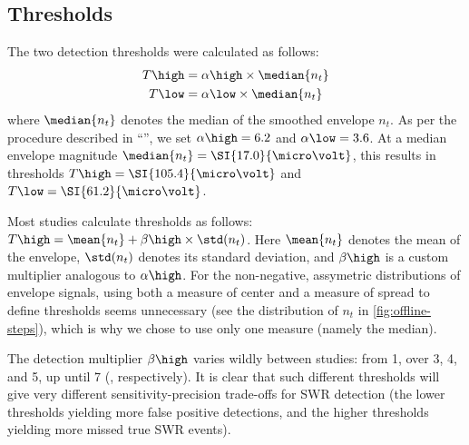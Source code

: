 \subsection{Thresholds}

The two detection thresholds were calculated as follows:
\begin{align}
\label{eq:thresholds-symbolic}
T\high &= \alpha\high \times \median{n_t} \\
T\low  &= \alpha\low  \times \median{n_t}
\end{align}
%
where $\median{n_t}$ denotes the median of the smoothed envelope $n_t$. As per the procedure described in ``'', we set $\alpha\high = 6.2$ and $\alpha\low = 3.6$. At a median envelope magnitude $\median{n_t} = \SI{17.0}{\micro\volt}$, this results in thresholds $T\high = \SI{105.4}{\micro\volt}$ and $T\low = \SI{61.2}{\micro\volt}$.

Most studies calculate thresholds as follows: $T\high = \mean{n_t} + \beta\high \times \std(n_t)$. Here $\mean{n_t}$ denotes the mean of the envelope, $\std(n_t)$ denotes its standard deviation, and $\beta\high$ is a custom multiplier analogous to $\alpha\high$. For the non-negative, assymetric distributions of envelope signals, using both a measure of center and a measure of spread to define thresholds seems unnecessary (see the distribution of $n_t$ in \cref{fig:offline-steps}), which is why we chose to use only one measure (namely the median).

The detection multiplier $\beta\high$ varies wildly between studies: from 1, over 3, 4, and 5, up until 7 (\cite{Csicsvari2000,Dutta2018,Behrens2005,Sadowski2016,Nadasdy1999}, respectively).\footnotemark{} It is clear that such different thresholds will give very different sensitivity-precision trade-offs for SWR detection (the lower thresholds yielding more false positive detections, and the higher thresholds yielding more missed true SWR events).


